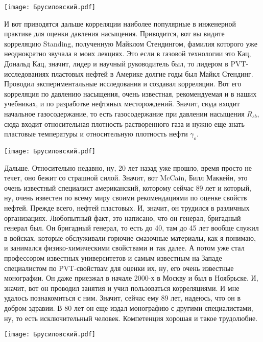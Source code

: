 \documentclass[main.tex]{subfiles}
\begin{document}
\begin{center}
\texttt{[image: Брусиловский.pdf]}
\end{center}

И вот приводятся дальше корреляции наиболее популярные в инженерной практике для оценки давления насыщения.
Приводится, вот вы видите корреляцию Standing, полученную Майклом Стендингом, фамилия которого уже неоднократно звучала в моих лекциях.
Это если в газовой технологии это Кац, Дональд Кац, значит, лидер и научный руководитель был, то лидером в PVT-исследованиях пластовых нефтей в Америке долгие годы был Майкл Стендинг.
Проводил экспериментальные исследования и создавал корреляции.
Вот его корреляция по давлению насыщения, очень известная, рекомендуемая и в наших учебниках, и по разработке нефтяных месторождений.
Значит, сюда входит начальное газосодержание, то есть газосодержание при давлении насыщения $R_{sb}$, сюда входит относительная плотность растворенного газа и нужно еще знать пластовые температуры и относительную плотность нефти $\gamma_{o}$.

\begin{center}
\texttt{[image: Брусиловский.pdf]}
\end{center}

Дальше.
Относительно недавно, ну, 20 лет назад уже прошло, время просто не течет, оно бежит со страшной силой.
Значит, вот McCain, Билл Маккейн, это очень известный специалист американский, которому сейчас 89 лет и который, ну, очень известен по всему миру своими рекомендациями по оценке свойств нефтей.
Прежде всего, нефтей пластовых.
И, значит, он трудился в различных организациях.
Любопытный факт, это написано, что он генерал, бригадный генерал был.
Он бригадный генерал, то есть до 40, там до 45 лет вообще служил в войсках, которые обслуживали горючие смазочные материалы, как я понимаю, и занимался физико-химическими свойствами и так далее.
А потом уже стал профессором известных университетов и самым известным на Западе специалистом по PVT-свойствам для оценки их, ну, его очень известные монографии.
Он даже приезжал в начале 2000-х в Москву и был в Ноябрьске.
И, значит, вот он проводил занятия и учил пользоваться корреляциями.
И мне удалось познакомиться с ним.
Значит, сейчас ему 89 лет, надеюсь, что он в добром здравии.
В 80 лет он еще издал монографию с другими специалистами, ну, то есть исключительный человек.
Компетенция хорошая и такое трудолюбие.

\begin{center}
\texttt{[image: Брусиловский.pdf]}
\end{center}
\end{document}
